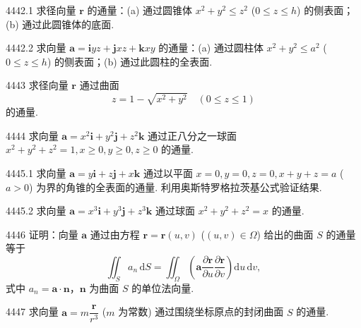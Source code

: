 \begin{prob}[M]{4442.1}
求径向量 $\boldsymbol{r}$ 的通量：(a) 通过圆锥体 $x^2 + y^2 \leqslant z^2$ ($0 \leqslant z \leqslant h$) 的侧表面；(b) 通过此圆锥体的底面.
\end{prob}

\begin{prob}[M]{4442.2}
求向量 $\boldsymbol{a} = \boldsymbol{i}yz + \boldsymbol{j}xz + \boldsymbol{k}xy$ 的通量：(a) 通过圆柱体 $x^2 + y^2 \leqslant a^2$ ($0 \leqslant z \leqslant h$) 的侧表面；(b) 通过此圆柱的全表面.
\end{prob}

\begin{prob}[M]{4443}
求径向量 $\boldsymbol{r}$ 通过曲面
\[
z = 1 - \sqrt{x^2 + y^2} \quad (0 \leqslant z \leqslant 1)
\]
的通量.
\end{prob}

\begin{prob}[M]{4444}
求向量 $\boldsymbol{a} = x^2\boldsymbol{i} + y^2\boldsymbol{j} + z^2\boldsymbol{k}$ 通过正八分之一球面 $x^2 + y^2 + z^2 = 1, x \geqslant 0, y \geqslant 0, z \geqslant 0$ 的通量.
\end{prob}

\begin{prob}[M]{4445.1}
求向量 $\boldsymbol{a} = y\boldsymbol{i} + z\boldsymbol{j} + x\boldsymbol{k}$ 通过以平面 $x = 0, y = 0, z = 0, x + y + z = a$ ($a > 0$) 为界的角锥的全表面的通量. 利用奥斯特罗格拉茨基公式验证结果.
\end{prob}

\begin{prob}[M]{4445.2}
求向量 $\boldsymbol{a} = x^3\boldsymbol{i} + y^3\boldsymbol{j} + z^3\boldsymbol{k}$ 通过球面 $x^2 + y^2 + z^2 = x$ 的通量.
\end{prob}

\begin{prob}[M]{4446}
证明：向量 $\boldsymbol{a}$ 通过由方程 $\boldsymbol{r} = \boldsymbol{r}(u, v)$ ($(u, v) \in \Omega$) 给出的曲面 $S$ 的通量等于
\[
\iint_S a_n \,\mathrm{d}S = \iint_\Omega \left( \boldsymbol{a} \frac{\partial \boldsymbol{r}}{\partial u} \frac{\partial \boldsymbol{r}}{\partial v} \right) \mathrm{d}u\,\mathrm{d}v,
\]
式中 $a_n = \boldsymbol{a} \cdot \boldsymbol{n}$，$\boldsymbol{n}$ 为曲面 $S$ 的单位法向量.
\end{prob}

\begin{prob}[M]{4447}
求向量 $\boldsymbol{a} = m \dfrac{\boldsymbol{r}}{r^3}$ ($m$ 为常数) 通过围绕坐标原点的封闭曲面 $S$ 的通量.
\end{prob}

